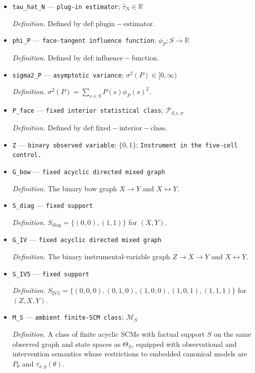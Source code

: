 \documentclass{article}
\begin{document}
\begin{itemize}
  \par\smallskip\noindent\emph{Definition.} \(\widehat P_N(s)=C_N(s)/N\).
  \item \texttt{tau\_\allowbreak{}hat\_\allowbreak{}N} --- \texttt{plug-\allowbreak{}in estimator}; \(\widehat\tau_N\in\mathbb R\)
  \par\smallskip\noindent\emph{Definition.} Defined by \(\mathrm{def:plugin-estimator}\).
  \item \texttt{phi\_\allowbreak{}P} --- \texttt{face-\allowbreak{}tangent influence function}; \(\phi_P:S\to\mathbb R\)
  \par\smallskip\noindent\emph{Definition.} Defined by \(\mathrm{def:influence-function}\).
  \item \texttt{sigma2\_\allowbreak{}P} --- \texttt{asymptotic variance}; \(\sigma^2(P)\in[0,\infty)\)
  \par\smallskip\noindent\emph{Definition.} \(\sigma^2(P)=\sum_{s\in S}P(s)\phi_P(s)^2\).
  \item \texttt{P\_\allowbreak{}face} --- \texttt{fixed interior statistical class}; \(\mathcal P_{S,\epsilon,\underline\sigma}\)
  \par\smallskip\noindent\emph{Definition.} Defined by \(\mathrm{def:fixed-interior-class}\).
  \item \texttt{Z} --- \texttt{binary observed variable}; \(\{0,1\}\); \texttt{Instrument in the five-\allowbreak{}cell control.}
  \item \texttt{G\_\allowbreak{}bow} --- \texttt{fixed acyclic directed mixed graph}
  \par\smallskip\noindent\emph{Definition.} The binary bow graph \(X\to Y\) and \(X\leftrightarrow Y\).
  \item \texttt{S\_\allowbreak{}diag} --- \texttt{fixed support}
  \par\smallskip\noindent\emph{Definition.} \(S_{\mathrm{diag}}=\{(0,0),(1,1)\}\) for \((X,Y)\).
  \item \texttt{G\_\allowbreak{}IV} --- \texttt{fixed acyclic directed mixed graph}
  \par\smallskip\noindent\emph{Definition.} The binary instrumental-variable graph \(Z\to X\to Y\) and \(X\leftrightarrow Y\).
  \item \texttt{S\_\allowbreak{}IV5} --- \texttt{fixed support}
  \par\smallskip\noindent\emph{Definition.} \(S_{\mathrm{IV5}}=\{(0,0,0),(0,1,0),(1,0,0),(1,0,1),(1,1,1)\}\) for \((Z,X,Y)\).
  \item \texttt{M\_\allowbreak{}S} --- \texttt{ambient finite-\allowbreak{}SCM class}; \(\mathcal M_S\)
  \par\smallskip\noindent\emph{Definition.} A class of finite acyclic SCMs with factual support \(S\) on the same observed graph and state spaces as \(\Theta_S\), equipped with observational and intervention semantics whose restrictions to embedded canonical models are \(P_\theta\) and \(\tau_{x,y}(\theta)\).
\end{itemize}
\end{document}
